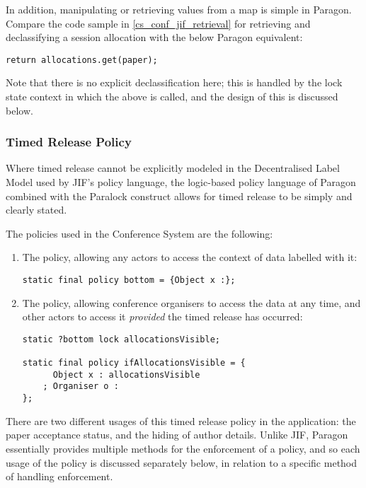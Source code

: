 In addition, manipulating or retrieving values from a map is simple in Paragon. Compare the code sample in \ref{cs_conf_jif_retrieval} for retrieving and declassifying a session allocation with the below Paragon equivalent:

\begin{verbatim}
return allocations.get(paper);
\end{verbatim}

Note that there is no explicit declassification here; this is handled by the lock state context in which the above is called, and the design of this is discussed below.

\subsubsection{Timed Release Policy}

Where timed release cannot be explicitly modeled in the Decentralised Label Model used by JIF's policy language, the logic-based policy language of Paragon combined with the Paralock construct allows for timed release to be simply and clearly stated.

The policies used in the Conference System are the following:

\begin{enumerate}
	\item The  policy, allowing any actors to access the context of data labelled with it:
	
	\begin{verbatim}
static final policy bottom = {Object x :};
	\end{verbatim}
	
	\item The  policy, allowing conference organisers to access the data at any time, and other actors to access it \textit{provided} the timed release has occurred:
	
	\begin{verbatim}
static ?bottom lock allocationsVisible;

static final policy ifAllocationsVisible = {
 	  Object x : allocationsVisible 
	; Organiser o :
};
	\end{verbatim}
\end{enumerate}

There are two different usages of this timed release policy in the application: the paper acceptance status, and the hiding of author details. Unlike JIF, Paragon essentially provides multiple methods for the enforcement of a policy, and so each usage of the policy is discussed separately below, in relation to a specific method of handling enforcement.

